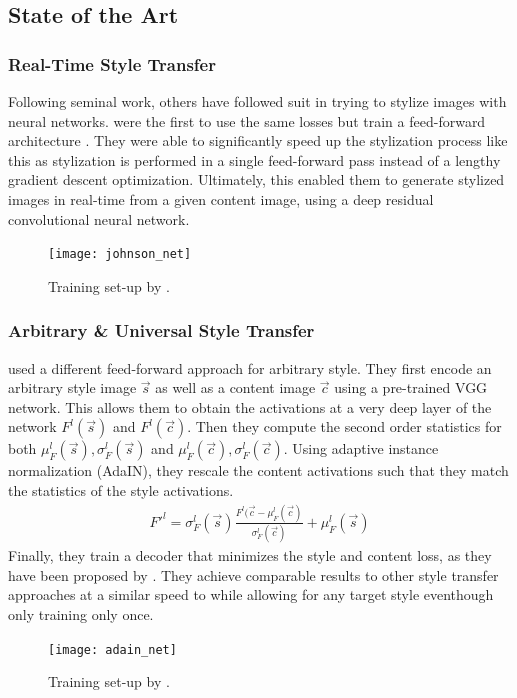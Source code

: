 \subsection{State of the Art}

\subsubsection{Real-Time Style Transfer}
Following \citeauthor*{gatys} seminal work, others have followed suit in trying to stylize images with neural networks.
\citeauthor*{Johnson} were the first to use the same losses but train a feed-forward architecture \cite{johnson}.
They were able to significantly speed up the stylization process like this as stylization is performed in a single feed-forward pass instead of a lengthy gradient descent optimization.
Ultimately, this enabled them to generate stylized images in real-time from a given content image, using a deep residual convolutional neural network.
\begin{figure}
    \texttt{[image: johnson\_net]}
    \caption[]{Training set-up by \citeauthor*{johnson}. \cite{johnson}}
\end{figure}

\subsubsection{Arbitrary \& Universal Style Transfer}
\citeauthor*{AdaIN} used a different feed-forward approach for arbitrary style.
They first encode an arbitrary style image $\vec{s}$ as well as a content image $\vec{c}$ using a pre-trained VGG network.
This allows them to obtain the activations at a very deep layer of the network $F^l(\vec{s})$ and $F^l(\vec{c})$.
Then they compute the second order statistics for both $\mu_F^l(\vec{s}), \sigma_F^l(\vec{s})$ and $\mu_F^l(\vec{c}), \sigma_F^l(\vec{c})$.
Using adaptive instance normalization (AdaIN), they rescale the content activations such that they match the statistics of the style activations.
\begin{align}
    F'^l = \sigma_F^l(\vec{s}) \frac{F^l(\vec{c} - \mu_F^l(\vec{c})}{\sigma_F^l(\vec{c})} + \mu_F^l(\vec{s}) 
\end{align}
Finally, they train a decoder that minimizes the style and content loss, as they have been proposed by \citeauthor*{gatys}.
They achieve comparable results to other style transfer approaches at a similar speed to \citeauthor*{johnson} while allowing for any target style eventhough only training only once.
\begin{figure}
    \texttt{[image: adain\_net]}
    \caption[]{Training set-up by \citeauthor*{AdaIN}. \cite{AdaIN}}
\end{figure}

